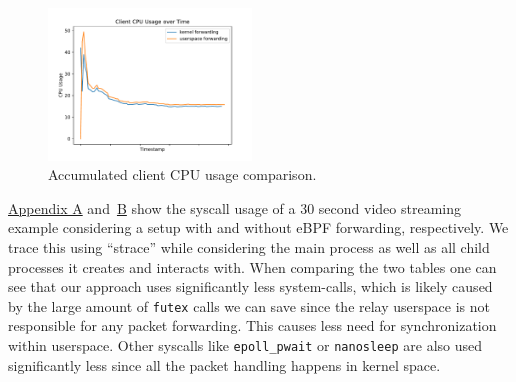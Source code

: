 \begin{figure}[H]
\begin{minipage}{0.48\textwidth}
    \end{minipage}\hfill
    \begin{minipage}{\textwidth}
        \centering
        \includegraphics[width=0.48\textwidth]{figures/04_testing_and_results/cpu_usage_client_ns.pdf}
        \caption[Client CPU usage comparison]{Accumulated client CPU usage comparison.}\label{fig:cpu-utilization-client}
    \end{minipage}
\end{figure}



\hyperref[chap:appendix-fast-relay]{Appendix A} and~\hyperref[chap:appendix-plain-relay]{B} show 
the syscall usage of a 30 second video streaming example considering a setup with and without eBPF 
forwarding, respectively.
We trace this using ``strace'' while considering the main process as well as all child processes
it creates and interacts with.
When comparing the two tables one can see that our approach uses significantly less system-calls, 
which is likely caused by the large amount of \verb|futex| calls we can save since the relay userspace is not 
responsible for any packet forwarding.
This causes less need for synchronization within userspace.
Other syscalls like \verb|epoll_pwait| or \verb|nanosleep| are also used significantly less since all the 
packet handling happens in kernel space.

